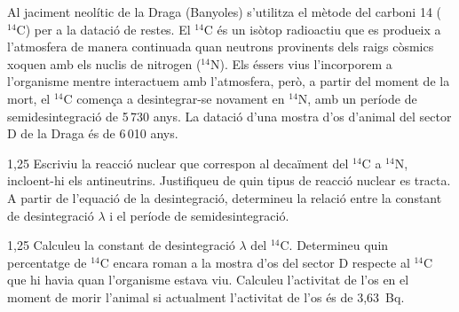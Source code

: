 Al jaciment neolític de la Draga (Banyoles) s'utilitza el mètode del carboni 14 (${}^{14}\mathrm{C}$) per a la datació de restes. El ${}^{14}\mathrm{C}$ és un isòtop radioactiu que es produeix a l'atmosfera de manera continuada quan neutrons provinents dels raigs còsmics xoquen amb els nuclis de nitrogen (${}^{14}\mathrm{N}$). Els éssers vius l'incorporem a l'organisme mentre interactuem amb l'atmosfera, però, a partir del moment de la mort, el ${}^{14}\mathrm{C}$ comença a desintegrar-se novament en ${}^{14}\mathrm{N}$, amb un període de semidesintegració de 5\,730 anys. La datació d'una mostra d'os d'animal del sector D de la Draga és de 6\,010 anys.

\begin{apartat}{1,25}
Escriviu la reacció nuclear que correspon al decaïment del ${}^{14}\mathrm{C}$ a ${}^{14}\mathrm{N}$, incloent-hi els antineutrins. Justifiqueu de quin tipus de reacció nuclear es tracta. A partir de l'equació de la desintegració, determineu la relació entre la constant de desintegració $\lambda$ i el període de semidesintegració.
\end{apartat}

\begin{apartat}{1,25}
Calculeu la constant de desintegració $\lambda$ del ${}^{14}\mathrm{C}$. Determineu quin percentatge de ${}^{14}\mathrm{C}$ encara roman a la mostra d'os del sector D respecte al ${}^{14}\mathrm{C}$ que hi havia quan l'organisme estava viu. Calculeu l'activitat de l'os en el moment de morir l'animal si actualment l'activitat de l'os és de 3,63~Bq.
\end{apartat}

